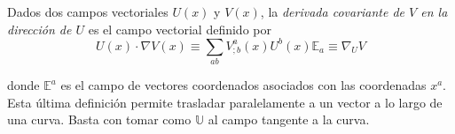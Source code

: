 \begin{definicion}
  Dados dos campos  vectoriales $U(x)$ y $V(x)$, la  {\it derivada covariante de
    $V$ en la direcci\'on de $U$} es el campo vectorial definido por
  \[
  U(x) \cdot \nabla V(x) \equiv \sum_{ab} V^a_{;b}(x) U^b(x) \mathbb{E}_a \equiv
  \nabla_U V
  \]
\end{definicion}
%
donde  $\mathbb{E}^a$ es  el campo  de  vectores coordenados  asociados con  las
coordenadas $x^a$. Esta \'ultima  definici\'on permite trasladar paralelamente a
un vector a  lo largo de una  curva. Basta con tomar como  $\mathbb{U}$ al campo
tangente a la curva.